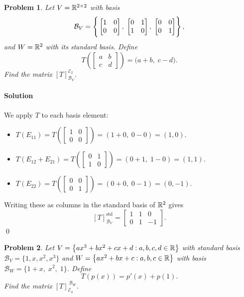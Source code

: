 \documentclass[11pt,openany]{article}
\newtheorem{problem}{Problem}
\newenvironment{solution}{\paragraph{\color{magenta}Solution}}{}
\begin{document}
\newpage
\begin{problem}
Let $V = \mathbb{R}^{2\times 2}$ with basis
\[
\mathcal{B}_V = \set{\,\begin{bmatrix}
		1 & 0 \\ 0 & 0
	\end{bmatrix},\;\begin{bmatrix}
	0 & 1 \\ 1 & 0
\end{bmatrix},\;\begin{bmatrix}
0 & 0 \\ 0 & 1
\end{bmatrix}},
\]
and $W = \Bbb R^2$ with its standard basis.  Define
\[
T\left(\begin{bmatrix}a&b\\c&d\end{bmatrix}\right)
= \bigl(a + b,\;c - d\bigr).
\]
Find the matrix $[T]_{\mathcal{B}_V}^{\mathcal{E}_2}$.
\end{problem}
\begin{solution}\color{white}
	We apply $T$ to each basis element:
	
	\begin{itemize}
		\item $T(E_{11}) = T(\begin{bmatrix}1&0\\0&0\end{bmatrix})
		= (1+0,\;0-0) = (1,0).$
		\item $T(E_{12}+E_{21})
		= T(\begin{bmatrix}0&1\\1&0\end{bmatrix})
		= (0+1,\;1-0) = (1,1).$
		\item $T(E_{22})
		= T(\begin{bmatrix}0&0\\0&1\end{bmatrix})
		= (0+0,\;0-1) = (0,-1).$
	\end{itemize}
	
	Writing these as columns in the standard basis of $\Bbb R^2$ gives
	\[
	[T]_{\mathcal{B}_V}^{\text{std}}
	= \begin{bmatrix}
		1 & 1 & 0\\
		0 & 1 & -1
	\end{bmatrix}.
	\]\color{black}\vfill\hfill\qed
\end{solution}
\newpage
\begin{problem}
Let $V = \set{ax^3+bx^2+cx+d:a,b,c,d\in\mathbb{R}}$ with standard basis $\mathcal{B}_V=\{1,x,x^2,x^3\}$ and 
$W = \set{ax^2+bx+c:a,b,c\in\mathbb{R}}$ with basis $\mathcal{B}_W=\{1 + x,\;x^2,\;1\}$.  Define
\[
T(p(x)) = p'(x) + p(1).
\]
Find the matrix $[T]_{\mathcal{E}_4}^{\,\mathcal{B}_W}$.
\end{problem}
\end{document}
